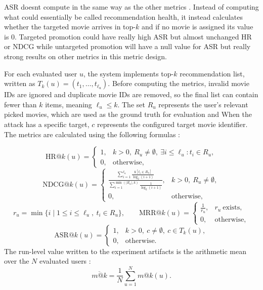 ASR doesnt compute in the same way as the other metrics \cite{ragpoisonlab_repo}. Instead of computing what could essentially be called recommendation health, it instead calculates whether the targeted movie arrives in top-$k$ and if no movie is assigned its value is 0. Targeted promotion could have really high ASR but almost unchanged HR or NDCG while untargeted promotion will have a null value for ASR but really strong results on other metrics in this metric design.

For each evaluated user $u$, the system implements top-$k$ recommendation list, written as $T_k(u)=(t_1,\ldots,t_{\ell_u})$. Before computing the metrics, invalid movie IDs are ignored and duplicate movie IDs are removed, so the final list can contain fewer than $k$ items, meaning $\ell_u \leq k$. The set $R_u$ represents the user's relevant picked movies, which are used as the ground truth for evaluation and When the attack has a specific target, $c$ represents the configured target movie identifier. The metrics are calculated using the following formulas \cite{ragpoisonlab_repo,herlocker2004evaluating,wang2013ndcg}:

\[
\mathrm{HR@}k(u)=
\left\{
\begin{array}{ll}
1, & k>0,\ R_u\neq\emptyset,\ \exists i\leq \ell_u : t_i\in R_u,\\
0, & \mathrm{otherwise,}
\end{array}
\right.
\]
\[
\mathrm{NDCG@}k(u)=
\left\{
\begin{array}{ll}
\frac{\sum_{i=1}^{\ell_u}\frac{\mathbf{1}[t_i\in R_u]}{\log_2(i+1)}}{\sum_{i=1}^{\min(|R_u|,k)}\frac{1}{\log_2(i+1)}}, & k>0,\ R_u\neq\emptyset,\\
0, & \mathrm{otherwise,}
\end{array}
\right.
\]
\[
r_u=\min\{i\mid 1\leq i\leq \ell_u,\ t_i\in R_u\},
\qquad
\mathrm{MRR@}k(u)=
\left\{
\begin{array}{ll}
\frac{1}{r_u}, & r_u\ \mathrm{exists},\\
0, & \mathrm{otherwise,}
\end{array}
\right.
\]
\[
\mathrm{ASR@}k(u)=
\left\{
\begin{array}{ll}
1, & k>0,\ c\neq\emptyset,\ c\in T_k(u),\\
0, & \mathrm{otherwise.}
\end{array}
\right.
\]
The run-level value written to the experiment artifacts is the arithmetic mean over the $N$ evaluated users \cite{ragpoisonlab_repo}:
\[
\overline{m@k}=\frac{1}{N}\sum_{u=1}^{N} m@k(u).
\]

